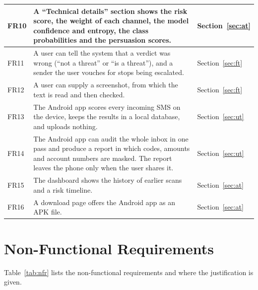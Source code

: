 {{\begin{longtable}{|p{1.2cm}|p{10.6cm}|p{2.6cm}|}
FR10 & A ``Technical details'' section shows the risk score, the weight of each channel, the model confidence and entropy, the class probabilities and the persuasion scores. & Section~\ref{sec:at} \\ \hline
FR11 & A user can tell the system that a verdict was wrong (``not a threat'' or ``is a threat''), and a sender the user vouches for stops being escalated. & Section~\ref{sec:ft} \\ \hline
FR12 & A user can supply a screenshot, from which the text is read and then checked. & Section~\ref{sec:ft} \\ \hline
FR13 & The Android app scores every incoming SMS on the device, keeps the results in a local database, and uploads nothing. & Section~\ref{sec:ut} \\ \hline
FR14 & The Android app can audit the whole inbox in one pass and produce a report in which codes, amounts and account numbers are masked. The report leaves the phone only when the user shares it. & Section~\ref{sec:ut} \\ \hline
FR15 & The dashboard shows the history of earlier scans and a risk timeline. & Section~\ref{sec:at} \\ \hline
FR16 & A download page offers the Android app as an APK file. & Section~\ref{sec:at} \\ \hline
\end{longtable}
}

\section{Non-Functional Requirements}
Table~\ref{tab:nfr} lists the non-functional requirements and where the justification is given.

}

